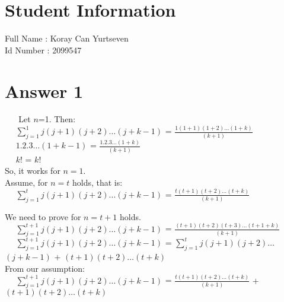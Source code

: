 ﻿\documentclass[12pt]{article}
\begin{document}
\section*{Student Information } 
Full Name :  Koray Can Yurtseven\\
Id Number :  2099547\\

\section*{Answer 1}

$\,$ $\,$ $\,$ $\,$Let $n$=1. Then:\\

$\quad$  
	$\displaystyle\sum_{j=1}^1$$j(j+1)(j+2)$$\ldots$$(j+k-1)$ = $\frac{1(1+1)(1+2)\ldots(1+k)}{(k+1)}$\\

$\quad$
	$1.2.3\ldots(1+k-1)$ = $\frac{1.2.3\ldots(1+k)}{(k+1)}$\\
    
$\quad$
	$k!$ = $k!$ \\
    
So, it works for $n=1$.\\

Assume, for $n=t$ holds, that is:\\

$\quad$  
	$\displaystyle\sum_{j=1}^t$$j(j+1)(j+2)$$\ldots$$(j+k-1)$ = $\frac{t(t+1)(t+2)\ldots(t+k)}{(k+1)}$\\
    
$\qquad$

We need to prove for $n=t+1$ holds.\\

$\quad$  
	$\displaystyle\sum_{j=1}^{t+1}$$j(j+1)(j+2)$$\ldots$$(j+k-1)$ = $\frac{(t+1)(t+2)(t+3)\ldots(t+1+k)}{(k+1)}$\\
    
$\quad$  
	$\displaystyle\sum_{j=1}^{t+1}$$j(j+1)(j+2)$$\ldots$$(j+k-1)$ =
    $\displaystyle\sum_{j=1}^t$$j(j+1)(j+2)$$\ldots$$(j+k-1)$ $+$ $(t+1)(t+2)\ldots(t+k)$\\
    
From our assumption:\\

$\quad$  
	$\displaystyle\sum_{j=1}^{t+1}$$j(j+1)(j+2)$$\ldots$$(j+k-1)$ =  $\frac{t(t+1)(t+2)\ldots(t+k)}{(k+1)}$ $+$ $(t+1)(t+2)\ldots(t+k)$\\
    
\end{document}
